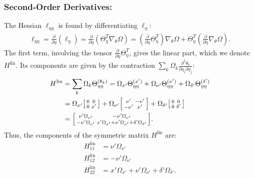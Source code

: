 \documentclass{article}
\begin{document}
\subsubsection{Second-Order Derivatives:}

The Hessian $\ell_{\eta\eta}$ is found by differentiating $\ell_\eta$:
%
\begin{align}
  \ell_{\eta\eta} = \frac{\partial}{\partial \eta} (\ell_\eta) = \frac{\partial}{\partial \eta} (\Theta_\eta^T \nabla_\theta \Omega) = (\frac{\partial}{\partial \eta} \Theta_\eta^T) \nabla_\theta \Omega + \Theta_\eta^T (\frac{\partial}{\partial \eta} \nabla_\theta \Omega).
\end{align}
%
The first term, involving the tensor $\frac{\partial}{\partial \eta} \Theta_\eta^T$, gives the linear part, which we denote $H^{\text{lin}}$.
Its components are given by the contraction $\sum_k \Omega_k \frac{\partial^2 \theta_k}{\partial \eta_i \partial \eta_j}$:
%
\begin{align}
  H^{\text{lin}} & = \sum_k \Omega_k \Theta_{\eta\eta}^{(\theta_k)} = \Omega_{x'} \Theta_{\eta\eta}^{(x')} + \Omega_{\nu'} \Theta_{\eta\eta}^{(\nu')} + \Omega_{\delta'} \Theta_{\eta\eta}^{(\delta')} \\
                 & = \Omega_{x'} \begin{bsmallmatrix} 0 & 0 \\ 0 & x' \end{bsmallmatrix} + \Omega_{\nu'} \begin{bsmallmatrix} \nu' & -\nu' \\ -\nu' & \nu' \end{bsmallmatrix} + \Omega_{\delta'} \begin{bsmallmatrix} 0 & 0 \\ 0 & \delta' \end{bsmallmatrix}                                    \\
                 & = \begin{bsmallmatrix}
    \nu' \Omega_{\nu'} & -\nu' \Omega_{\nu'} \\
    -\nu' \Omega_{\nu'} & x' \Omega_{x'} + \nu' \Omega_{\nu'} + \delta' \Omega_{\delta'}
  \end{bsmallmatrix}.
\end{align}
%
Thus, the components of the symmetric matrix $H^{\text{lin}}$ are:
%
\begin{align}
  H^{\text{lin}}_{11} & = \nu' \Omega_{\nu'}                                              \\
  H^{\text{lin}}_{12} & = -\nu' \Omega_{\nu'}                                             \\
  H^{\text{lin}}_{22} & = x' \Omega_{x'} + \nu' \Omega_{\nu'} + \delta' \Omega_{\delta'}.
\end{align}
\end{document}
